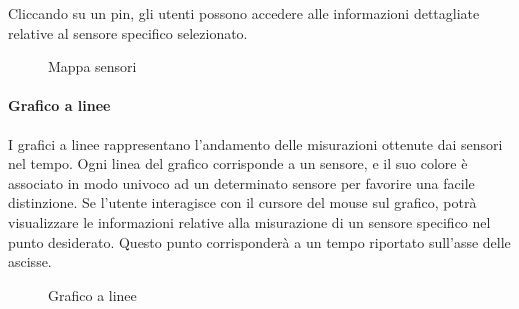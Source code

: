 Cliccando su un pin, gli utenti possono accedere alle informazioni dettagliate relative al sensore specifico selezionato.
\begin{figure}[H]
    \centering
    \caption{Mappa sensori}
    \label{fig:my_label}
\end{figure}


\paragraph{Grafico a linee}
\hypertarget{par:grafico_linee}{}
I grafici a linee rappresentano l'andamento delle misurazioni ottenute dai sensori nel tempo. Ogni linea del grafico corrisponde a un sensore, e il suo colore è associato in modo univoco ad un determinato sensore per favorire una facile distinzione. Se l'utente interagisce con il cursore del mouse sul grafico, potrà visualizzare le informazioni relative alla misurazione di un sensore specifico nel punto desiderato. Questo punto corrisponderà a un tempo riportato sull'asse delle ascisse. 
\begin{figure}[H]
    \centering
    \caption{Grafico a linee}
    \label{fig:my_label}
\end{figure}

